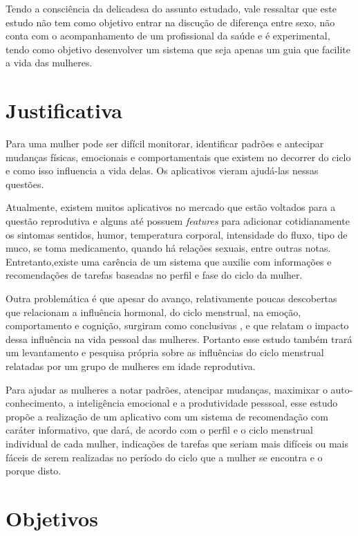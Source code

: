 Tendo a consciência da delicadesa do assunto estudado, vale ressaltar que este estudo não tem como objetivo entrar na discução de diferença entre sexo, não conta com o acompanhamento de um profissional da saúde e é experimental, tendo como objetivo desenvolver um sistema que seja apenas um guia que facilite a vida das mulheres. 

\section{Justificativa}

Para uma mulher pode ser difícil monitorar, identificar padrões e antecipar mudanças físicas, emocionais e comportamentais que existem no decorrer do ciclo e como isso influencia a vida delas. Os aplicativos vieram ajudá-las nessas questões.

Atualmente, existem muitos aplicativos no mercado que estão voltados para a questão reprodutiva e alguns até possuem \textit{features} para adicionar cotidianamente os sintomas sentidos, humor, temperatura corporal, intensidade do fluxo, tipo de muco, se toma medicamento, quando há relações sexuais, entre outras notas. Entretanto,existe uma carência de um sistema que auxilie com informações e recomendações de tarefas baseadas no perfil e fase do ciclo da mulher.

Outra problemática é que apesar do avanço, relativamente poucas descobertas que relacionam a influência hormonal, do ciclo menstrual, na emoção, comportamento e cognição, surgiram como conclusivas \cite{poroma2014}, e que relatam o impacto dessa influência na vida pessoal das mulheres. Portanto esse estudo também trará um levantamento e pesquisa própria sobre as influências do ciclo menstrual relatadas por um grupo de mulheres em idade reprodutiva.

Para ajudar as mulheres a notar padrões, atencipar mudanças, maximixar o auto-conhecimento, a inteligência emocional e a produtividade pesssoal, esse estudo propõe a realização de um aplicativo com um sistema de recomendação com caráter informativo, que dará, de acordo com o perfil e o ciclo menstrual individual de cada mulher, indicações de tarefas que seriam mais difíceis ou mais fáceis de serem realizadas no período do ciclo que a mulher se encontra e o porque disto.



\section{Objetivos}


